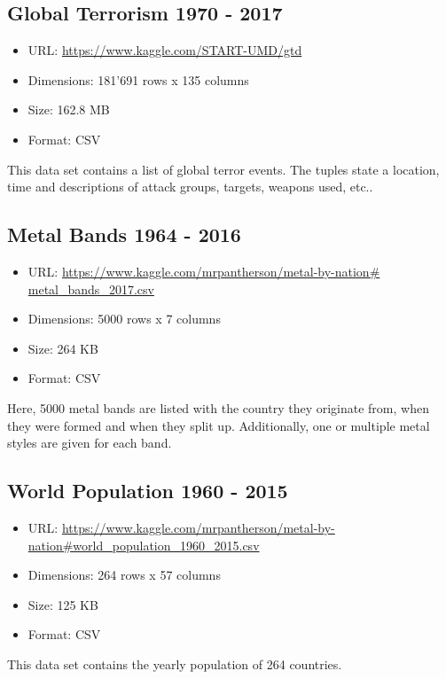 \subsection{Global Terrorism 1970 - 2017}
\begin{itemize}
	\item URL: \url{https://www.kaggle.com/START-UMD/gtd}
	\item Dimensions: 181'691 rows x 135 columns
	\item Size: 162.8 MB
	\item Format: CSV
\end{itemize}

This data set contains a list of global terror events. The tuples state a location, time and descriptions of attack groups, targets, weapons used, etc.. 
	
\subsection{Metal Bands 1964 - 2016}
\begin{itemize}
	\item URL: \url{https://www.kaggle.com/mrpantherson/metal-by-nation# metal_bands_2017.csv}
	\item Dimensions: 5000 rows x 7 columns
	\item Size: 264 KB
	\item Format: CSV
\end{itemize}

Here, 5000 metal bands are listed with the country they originate from, when they were formed and when they split up. Additionally, one or multiple metal styles are given for each band.

\subsection{World Population 1960 - 2015}
\begin{itemize}
	\item URL: \url{https://www.kaggle.com/mrpantherson/metal-by-nation#world_population_1960_2015.csv}
	\item Dimensions: 264 rows x 57 columns
	\item Size: 125 KB
	\item Format: CSV
\end{itemize}

This data set contains the yearly population of 264 countries.

